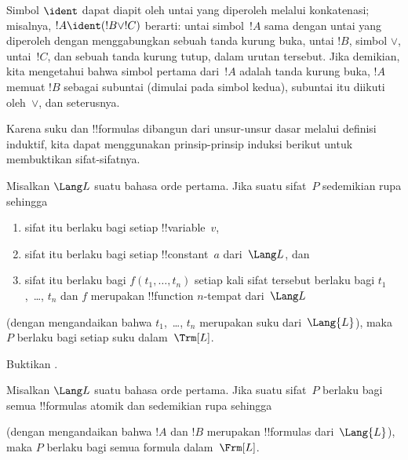 \documentclass[../../../include/open-logic-section]{subfiles}
\begin{document}
Simbol $\ident$ dapat diapit oleh untai yang diperoleh melalui konkatenasi;
misalnya, $!A \ident (!B \lor !C)$ berarti: untai simbol~$!A$ sama dengan
untai yang diperoleh dengan menggabungkan sebuah tanda kurung buka, untai
$!B$, simbol $\lor$, untai~$!C$, dan sebuah tanda kurung tutup, dalam urutan
tersebut. Jika demikian, kita mengetahui bahwa simbol pertama dari~$!A$
adalah tanda kurung buka, $!A$ memuat $!B$ sebagai subuntai (dimulai pada
simbol kedua), subuntai itu diikuti oleh~$\lor$, dan seterusnya.

Karena suku dan !!{formula}s dibangun dari unsur-unsur dasar melalui
definisi induktif, kita dapat menggunakan prinsip-prinsip induksi berikut
untuk membuktikan sifat-sifatnya.

\begin{lem}
    Misalkan $\Lang L$ suatu bahasa orde pertama.
    Jika suatu sifat~$P$ sedemikian rupa sehingga
    \begin{enumerate}
        \item sifat itu berlaku bagi setiap !!{variable}~$v$,
        \item sifat itu berlaku bagi setiap !!{constant}~$a$ dari~$\Lang L$,
          dan
        \item sifat itu berlaku bagi $f(t_1,\dotsc,t_n)$ setiap kali sifat
          tersebut berlaku bagi $t_1$,~\dots, $t_n$ dan $f$ merupakan
          !!{function} $n$-tempat dari~$\Lang L$
    \end{enumerate}
    (dengan mengandaikan bahwa $t_1$,~\dots, $t_n$ merupakan suku
    dari~$\Lang{L}$), maka $P$ berlaku bagi setiap suku dalam~$\Trm[L]$.
\end{lem}

\begin{prob}
    Buktikan .
\end{prob}

\begin{lem}
    Misalkan $\Lang L$ suatu bahasa orde pertama.
    Jika suatu sifat~$P$ berlaku bagi semua !!{formula}s atomik dan
    sedemikian rupa sehingga
    \begin{enumerate}
  \end{enumerate}
  (dengan mengandaikan bahwa $!A$ dan $!B$ merupakan !!{formula}s
  dari~$\Lang{L}$), maka $P$ berlaku bagi semua formula dalam~$\Frm[L]$.
\end{lem}
\end{document}
